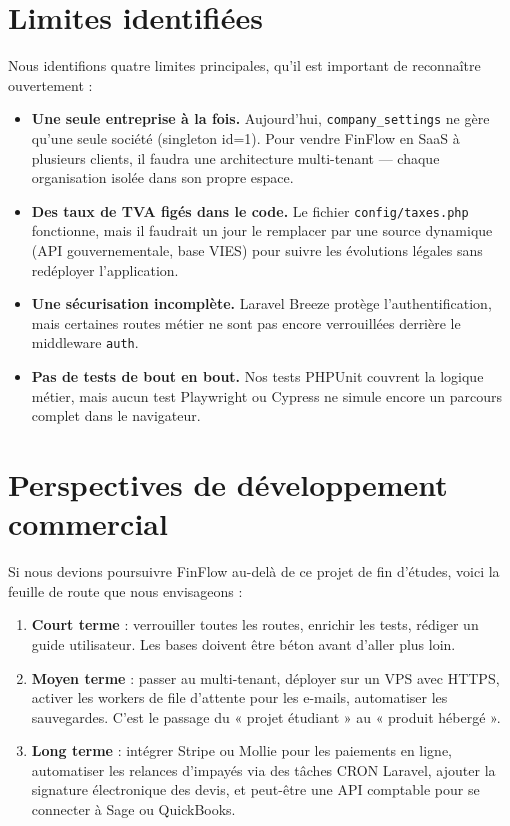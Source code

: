 \documentclass[12pt,a4paper]{report}
\begin{document}
\section{Limites identifiées}

Nous identifions quatre limites principales, qu'il est important de reconnaître ouvertement :

\begin{itemize}[leftmargin=*]
    \item \textbf{Une seule entreprise à la fois.} Aujourd'hui, \texttt{company\_settings} ne gère qu'une seule société (singleton id=1). Pour vendre FinFlow en SaaS à plusieurs clients, il faudra une architecture multi-tenant --- chaque organisation isolée dans son propre espace.
    \item \textbf{Des taux de TVA figés dans le code.} Le fichier \texttt{config/taxes.php} fonctionne, mais il faudrait un jour le remplacer par une source dynamique (API gouvernementale, base VIES) pour suivre les évolutions légales sans redéployer l'application.
    \item \textbf{Une sécurisation incomplète.} Laravel Breeze protège l'authentification, mais certaines routes métier ne sont pas encore verrouillées derrière le middleware \texttt{auth}.
    \item \textbf{Pas de tests de bout en bout.} Nos tests PHPUnit couvrent la logique métier, mais aucun test Playwright ou Cypress ne simule encore un parcours complet dans le navigateur.
\end{itemize}

\section{Perspectives de développement commercial}

Si nous devions poursuivre FinFlow au-delà de ce projet de fin d'études, voici la feuille de route que nous envisageons :

\begin{enumerate}[leftmargin=*]
    \item \textbf{Court terme} : verrouiller toutes les routes, enrichir les tests, rédiger un guide utilisateur. Les bases doivent être béton avant d'aller plus loin.
    \item \textbf{Moyen terme} : passer au multi-tenant, déployer sur un VPS avec HTTPS, activer les workers de file d'attente pour les e-mails, automatiser les sauvegardes. C'est le passage du « projet étudiant » au « produit hébergé ».
    \item \textbf{Long terme} : intégrer Stripe ou Mollie pour les paiements en ligne, automatiser les relances d'impayés via des tâches CRON Laravel, ajouter la signature électronique des devis, et peut-être une API comptable pour se connecter à Sage ou QuickBooks.
\end{enumerate}
\end{document}
